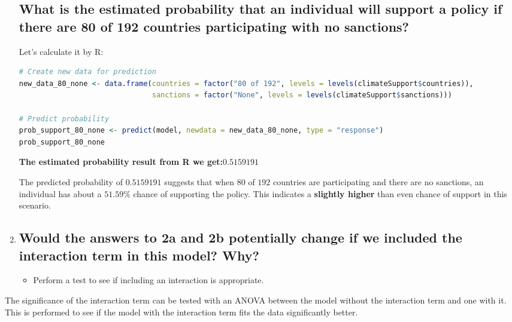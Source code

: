 \documentclass[12pt,letterpaper]{article}
\begin{document}
\begin{enumerate}
		\subsection*{What is the estimated probability that an individual will support a policy if there are 80 of 192 countries participating with no sanctions? }

Let's calculate it by R:
\begin{lstlisting}[language=R]
# Create new data for prediction
new_data_80_none <- data.frame(countries = factor("80 of 192", levels = levels(climateSupport$countries)),
                               sanctions = factor("None", levels = levels(climateSupport$sanctions)))

# Predict probability
prob_support_80_none <- predict(model, newdata = new_data_80_none, type = "response")
prob_support_80_none
  \end{lstlisting}

\textbf{The estimated probability result from R we get:$0.5159191$}

The predicted probability of $0.5159191$ suggests that when $80$ of $192$ countries are participating and there are no sanctions, an individual has about a $51.59\%$ chance of supporting the policy. This indicates a\textbf{ slightly higher }than even chance of support in this scenario.

  
		\item
		\subsection*{Would the answers to 2a and 2b potentially change if we included the interaction term in this model? Why?}
		\begin{itemize}
			\item Perform a test to see if including an interaction is appropriate.
		\end{itemize}
	\end{enumerate}
 The significance of the interaction term can be tested with an ANOVA between the model without the interaction term and one with it. This is performed to see if the model with the interaction term fits the data significantly better.
\end{document}
